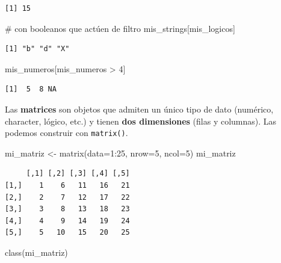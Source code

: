 \documentclass[
  letterpaper,
  DIV=11,
  numbers=noendperiod]{scrartcl}
\newenvironment{Shaded}{\begin{snugshade}}{\end{snugshade}}
\newcommand{\AttributeTok}[1]{\textcolor[rgb]{0.40,0.45,0.13}{#1}}
\newcommand{\CommentTok}[1]{\textcolor[rgb]{0.37,0.37,0.37}{#1}}
\newcommand{\DecValTok}[1]{\textcolor[rgb]{0.68,0.00,0.00}{#1}}
\newcommand{\FunctionTok}[1]{\textcolor[rgb]{0.28,0.35,0.67}{#1}}
\newcommand{\NormalTok}[1]{\textcolor[rgb]{0.00,0.23,0.31}{#1}}
\newcommand{\OtherTok}[1]{\textcolor[rgb]{0.00,0.23,0.31}{#1}}
\newcommand{\SpecialCharTok}[1]{\textcolor[rgb]{0.37,0.37,0.37}{#1}}
\begin{document}
\begin{verbatim}
[1] 15
\end{verbatim}

\begin{Shaded}
\begin{Highlighting}[]
\CommentTok{\# con booleanos que actúen de filtro}
\NormalTok{mis\_strings[mis\_logicos] }
\end{Highlighting}
\end{Shaded}

\begin{verbatim}
[1] "b" "d" "X"
\end{verbatim}

\begin{Shaded}
\begin{Highlighting}[]
\NormalTok{mis\_numeros[mis\_numeros }\SpecialCharTok{\textgreater{}} \DecValTok{4}\NormalTok{]}
\end{Highlighting}
\end{Shaded}

\begin{verbatim}
[1]  5  8 NA
\end{verbatim}

Las \textbf{matrices} son objetos que admiten un único tipo de dato
(numérico, character, lógico, etc.) y tienen \textbf{dos dimensiones}
(filas y columnas). Las podemos construir con \texttt{matrix()}.

\begin{Shaded}
\begin{Highlighting}[]
\NormalTok{mi\_matriz }\OtherTok{\textless{}{-}} \FunctionTok{matrix}\NormalTok{(}\AttributeTok{data=}\DecValTok{1}\SpecialCharTok{:}\DecValTok{25}\NormalTok{, }\AttributeTok{nrow=}\DecValTok{5}\NormalTok{, }\AttributeTok{ncol=}\DecValTok{5}\NormalTok{) }
\NormalTok{mi\_matriz }
\end{Highlighting}
\end{Shaded}

\begin{verbatim}
     [,1] [,2] [,3] [,4] [,5]
[1,]    1    6   11   16   21
[2,]    2    7   12   17   22
[3,]    3    8   13   18   23
[4,]    4    9   14   19   24
[5,]    5   10   15   20   25
\end{verbatim}

\begin{Shaded}
\begin{Highlighting}[]
\FunctionTok{class}\NormalTok{(mi\_matriz)}
\end{Highlighting}
\end{Shaded}
\end{document}
